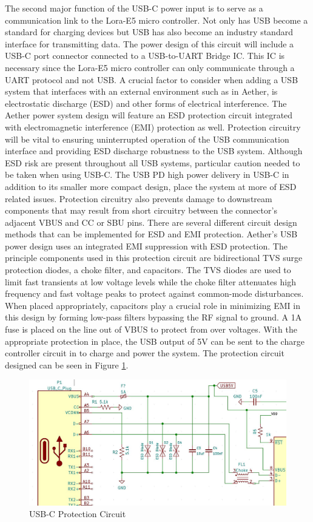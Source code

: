 The second major function of the USB-C power input is to serve as a communication link to the Lora-E5 micro controller. Not only has USB become a standard for charging devices but USB has also become an industry standard interface for transmitting data. The power design of this circuit will include a USB-C port connector connected to a USB-to-UART Bridge IC. This IC is necessary since the Lora-E5 micro controller can only communicate through a UART protocol and not USB. A crucial factor to consider when adding a USB system that interfaces with an external environment such as in Aether, is electrostatic discharge (ESD) and other forms of electrical interference. The Aether power system design will feature an ESD protection circuit integrated with electromagnetic interference (EMI) protection as well. Protection circuitry will be vital to ensuring uninterrupted operation of the USB communication interface and providing ESD discharge robustness to the USB system. Although ESD risk are present throughout all USB systems, particular caution needed to be taken when using USB-C. The USB PD high power delivery in USB-C in addition to its smaller more compact design, place the system at more of ESD related issues. Protection circuitry also prevents damage to downstream components that may result from short circuitry between the connector’s adjacent VBUS and CC or SBU pins. There are several different circuit design methods that can be implemented for ESD and EMI protection. Aether's USB power design uses an integrated EMI suppression with ESD protection. The principle components used in this protection circuit are bidirectional TVS surge protection diodes, a choke filter, and capacitors. The TVS diodes are used to limit fast transients at low voltage levels while the choke filter attenuates high frequency and fast voltage peaks to protect against common-mode disturbances. When placed appropriately, capacitors play a crucial role in minimizing EMI in this design by forming low-pass filters bypassing the RF signal to ground. A 1A fuse is placed on the line out of VBUS to protect from over voltages. With the appropriate protection in place, the USB output of 5V can be sent to the charge controller circuit in to charge and power the system. The protection circuit designed can be seen in Figure \ref{fig:USB-Protection}. 

\begin{figure}
    \centering
    \includegraphics[width=5.5in]{figures/USB-Protection.JPG}
    \caption{USB-C Protection Circuit}
    \label{fig:USB-Protection} 
\end{figure}

